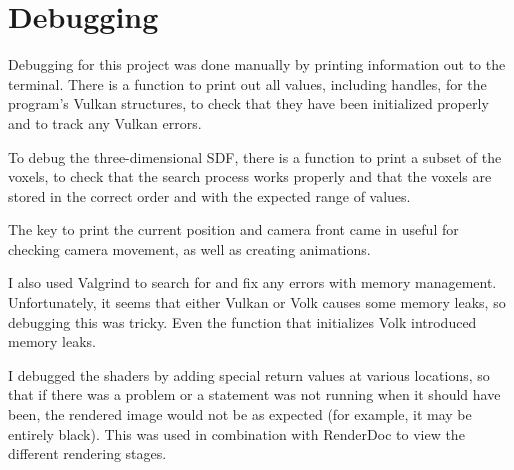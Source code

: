 \section{Debugging}

Debugging for this project was done manually by printing information out to the terminal. There is a function to print out all values, including handles, for the program's Vulkan structures, to check that they have been initialized properly and to track any Vulkan errors.\newline

To debug the three-dimensional SDF, there is a function to print a subset of the voxels, to check that the search process works properly and that the voxels are stored in the correct order and with the expected range of values.\newline

The key to print the current position and camera front came in useful for checking camera movement, as well as creating animations.\newline

I also used Valgrind to search for and fix any errors with memory management. Unfortunately, it seems that either Vulkan or Volk causes some memory leaks, so debugging this was tricky. Even the function that initializes Volk introduced memory leaks.\newline

I debugged the shaders by adding special return values at various locations, so that if there was a problem or a statement was not running when it should have been, the rendered image would not be as expected (for example, it may be entirely black). This was used in combination with RenderDoc to view the different rendering stages.

